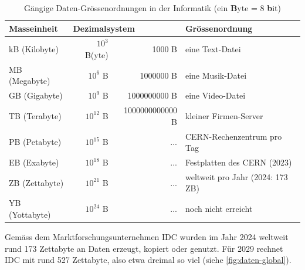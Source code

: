 \begin{table}[H]
  \centering
  \begin{tabular}{@{}lrrl@{}}
    \toprule
    \textbf{Masseinheit} & \multicolumn{2}{l}{\textbf{Dezimalsystem}} & Grössenordnung                                   \\ \midrule
    kB (Kilobyte)        & $10^3$ B(yte)                               & \num{1000} B             & eine Text-Datei            \\
    MB (Megabyte)        & $10^6$ B                                    & \num{1000000} B         & eine Musik-Datei           \\
    GB (Gigabyte)        & $10^9$ B                                    & \num{1000000000} B     & eine Video-Datei           \\
    TB (Terabyte)        & $10^{12}$ B                                 & \num{1000000000000} B & kleiner Firmen-Server      \\
    PB (Petabyte)        & $10^{15}$ B                                 & ...                 & CERN-Rechenzentrum pro Tag\footnotemark \\
    EB (Exabyte)         & $10^{18}$ B                                 & ...                 & Festplatten des CERN (2023)\footnotemark \\
    ZB (Zettabyte)       & $10^{21}$ B                                 & ...                 & weltweit pro Jahr (2024: 173 ZB) \\
    YB (Yottabyte)       & $10^{24}$ B                                 & ...                 & noch nicht erreicht        \\ \bottomrule
  \end{tabular}
  \caption{Gängige Daten-Grössenordnungen in der Informatik (ein \textbf{B}yte = 8 \textbf{b}it)}
  \label{table:groessenordnungen}
\end{table}
\addtocounter{footnote}{-1}

Gemäss dem Marktforschungsunternehmen IDC wurden im Jahr 2024 weltweit rund 173 Zettabyte an Daten erzeugt, kopiert oder genutzt. Für 2029 rechnet IDC mit rund 527 Zettabyte, also etwa dreimal so viel (siehe \cref{fig:daten-global}).

